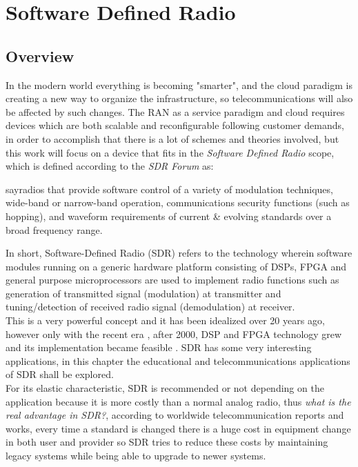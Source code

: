 \chapter{Software Defined Radio}
\label{chap:sdr}

\section{Overview}%
\label{sdr:overview}

In the modern world everything is becoming "smarter", and the cloud paradigm is
creating a new way to organize the infrastructure, so telecommunications will
also be affected by such changes. The RAN as a service  paradigm and cloud
requires devices which are both scalable and reconfigurable following customer
demands, in order to accomplish that there is a lot of schemes and theories
involved, but this work will focus on a device that fits in the \emph{Software
Defined Radio} scope, which is defined according to the \emph{SDR Forum}
\cite{web:sdrforum} as:

say{radios that provide software control of a variety of modulation techniques,
wide-band or narrow-band operation, communications security functions (such as
hopping), and waveform requirements of current \& evolving standards over a
broad frequency range.}

In short, Software-Defined Radio (SDR) refers to the technology wherein software
modules running on a generic hardware platform consisting of DSPs, FPGA and
general purpose microprocessors are used to implement radio functions such as
generation of transmitted signal (modulation) at transmitter and
tuning/detection of received radio signal (demodulation) at receiver.\\

This is a very powerful concept and it has been idealized over 20 years ago,
however only with the recent era , after 2000, DSP and FPGA technology grew and
its implementation became feasible \cite{ladimer2009}. SDR has some very
interesting applications, in this chapter the educational and telecommunications
applications of SDR shall be explored.\\

For its elastic characteristic, SDR is recommended or not depending on the
application because it is more costly than a normal analog radio, thus
\emph{what is the real advantage in SDR?}, according to worldwide
telecommunication reports and works, every time a standard is changed there is a
huge cost in equipment change in both user and provider so SDR tries to reduce
these costs by maintaining legacy systems while being able to upgrade to newer
systems\cite{dayananda2012}.\\

